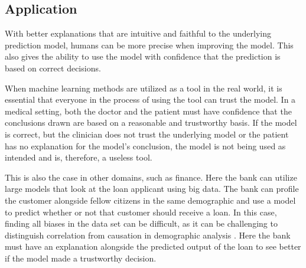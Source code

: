 \subsection{Application}

With better explanations that are intuitive and faithful to the underlying prediction model, humans can be more precise when improving the model. This also gives the ability to use the model with confidence that the prediction is based on correct decisions.


When machine learning methods are utilized as a tool in the real world, it is essential that everyone in the process of using the tool can trust the model. 
In a medical setting, both the doctor and the patient must have confidence that the conclusions drawn are based on a reasonable and trustworthy basis. If the model is correct, but the clinician does not trust the underlying model or the patient has no explanation for the model's conclusion, the model is not being used as intended and is, therefore, a useless tool.

This is also the case in other domains, such as finance. Here the bank can utilize large models that look at the loan applicant using big data. The bank can profile the customer alongside fellow citizens in the same demographic and use a model to predict whether or not that customer should receive a loan. In this case, finding all biases in the data set can be difficult, as it can be challenging to distinguish correlation from causation in demographic analysis \cite{garciaHarmsDemographicBias2019}. Here the bank must have an explanation alongside the predicted output of the loan to see better if the model made a trustworthy decision. 




